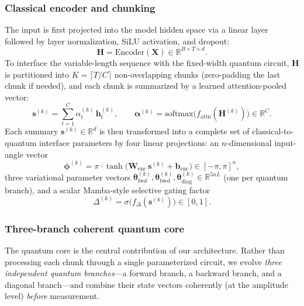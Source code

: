 \subsubsection{Classical encoder and chunking}
The input is first projected into the model hidden space via a linear layer followed by layer normalization, SiLU activation, and dropout:
\begin{equation}
    \mathbf{H} = \mathrm{Encoder}(\mathbf{X}) \in \mathbb{R}^{B \times T \times d}.
    \label{eq:input_proj}
\end{equation}
To interface the variable-length sequence with the fixed-width quantum circuit, $\mathbf{H}$ is partitioned into $K = \lceil T/C \rceil$ non-overlapping chunks (zero-padding the last chunk if needed), and each chunk is summarized by a learned attention-pooled vector:
\begin{equation}
    \mathbf{s}^{(k)} = \sum_{t=1}^{C} \alpha_t^{(k)}\, \mathbf{h}_t^{(k)},
    \qquad
    \boldsymbol{\alpha}^{(k)} = \mathrm{softmax}\!\big(f_{\mathrm{attn}}(\mathbf{H}^{(k)})\big) \in \mathbb{R}^{C}.
    \label{eq:chunk_summary}
\end{equation}
Each summary $\mathbf{s}^{(k)} \in \mathbb{R}^{d}$ is then transformed into a complete set of classical-to-quantum interface parameters by four linear projections: an $n$-dimensional input-angle vector
\begin{equation}
    \boldsymbol{\phi}^{(k)} = \pi\cdot\tanh\!\big(\mathbf{W}_{\text{enc}}\,\mathbf{s}^{(k)} + \mathbf{b}_{\text{enc}}\big) \in [-\pi, \pi]^{n},
    \label{eq:input_angles}
\end{equation}
three variational parameter vectors $\boldsymbol{\theta}_{\text{fwd}}^{(k)}, \boldsymbol{\theta}_{\text{bwd}}^{(k)}, \boldsymbol{\theta}_{\text{diag}}^{(k)} \in \mathbb{R}^{5nL}$ (one per quantum branch), and a scalar Mamba-style selective gating factor
\begin{equation}
    \Delta^{(k)} = \sigma\!\big(f_{\Delta}(\mathbf{s}^{(k)})\big) \in [0, 1].
    \label{eq:delta}
\end{equation}

\subsubsection{Three-branch coherent quantum core}
\label{sec:qm_core}
The quantum core is the central contribution of our architecture. Rather than processing each chunk through a single parameterized circuit, we evolve \emph{three independent quantum branches}---a forward branch, a backward branch, and a diagonal branch---and combine their state vectors coherently (at the amplitude level) \emph{before} measurement.

